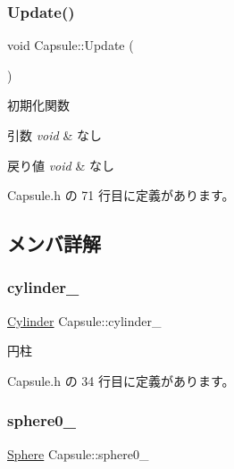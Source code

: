 \subsubsection{\texorpdfstring{Update()}{Update()}}
{\footnotesize\ttfamily void Capsule\+::\+Update (\begin{DoxyParamCaption}{ }\end{DoxyParamCaption})\hspace{0.3cm}{\ttfamily [inline]}}



初期化関数 


\begin{DoxyParams}{引数}
{\em void} & なし \\
\hline
\end{DoxyParams}

\begin{DoxyRetVals}{戻り値}
{\em void} & なし \\
\hline
\end{DoxyRetVals}


 Capsule.\+h の 71 行目に定義があります。



\subsection{メンバ詳解}
\mbox{\label{class_capsule_a7b7f46d36a0d810555aa5eb62da6a8ed}} 
\subsubsection{\texorpdfstring{cylinder\+\_\+}{cylinder\_}}
{\footnotesize\ttfamily \mbox{\hyperlink{class_cylinder}{Cylinder}} Capsule\+::cylinder\+\_\+\hspace{0.3cm}{\ttfamily [private]}}



円柱 



 Capsule.\+h の 34 行目に定義があります。

\mbox{\label{class_capsule_a37c7db7fe8cb06be2f374d7aba24267e}} 
\subsubsection{\texorpdfstring{sphere0\+\_\+}{sphere0\_}}
{\footnotesize\ttfamily \mbox{\hyperlink{class_sphere}{Sphere}} Capsule\+::sphere0\+\_\+\hspace{0.3cm}{\ttfamily [private]}}



